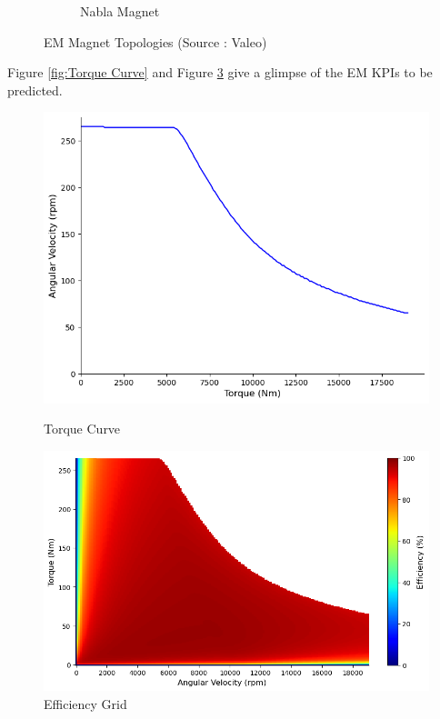 \documentclass{report} %
\begin{document}
\begin{figure}[H]
\begin{subfigure}{0.32\textwidth}
        \caption{Nabla Magnet}
        \label{fig:Nabla Magnet}
    \end{subfigure}
    \caption{\ac{EM} Magnet Topologies (Source : Valeo)}
    \label{fig:EM Magnet Topologies}
\end{figure}

Figure \ref{fig:Torque Curve} and Figure \ref{fig:Efficiency Grid} give a glimpse of the \ac{EM} \ac{KPI}s to be predicted. \\
\begin{figure}[H]
    \centering
    \begin{minipage}[b]{0.44\textwidth}
        \centering
        \includegraphics[width=\textwidth]{./ReportImages/TorqueCurve.png}
        \caption{Torque Curve} %
        \label{fig:Torque Curve}
    \end{minipage}
    \hfill
    \begin{minipage}[b]{0.54\textwidth}
        \centering
        \includegraphics[width=\textwidth]{./ReportImages/EfficiencyGrid.png}
        \caption{Efficiency Grid}
        \label{fig:Efficiency Grid}
    \end{minipage}
\end{figure}
\end{document}
